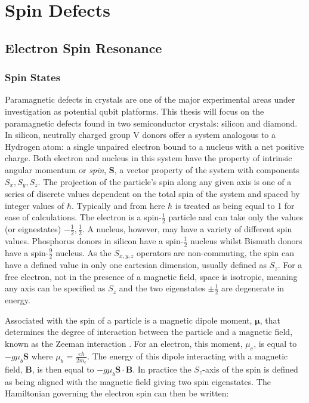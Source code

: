 
\chapter{Spin Defects}

\section{Electron Spin Resonance}
\subsection{Spin States}

Paramagnetic defects in crystals are one of the major experimental areas under investigation as potential qubit platforms. This thesis will focus on the paramagnetic defects found in two semiconductor crystals: silicon and diamond. In silicon, neutrally charged group V donors offer a system analogous to a Hydrogen atom: a single unpaired electron bound to a nucleus with a net positive charge. Both electron and nucleus in this system have the property of intrinsic angular momentum or \emph{spin}, $\mathbf{S}$, a vector property of the system with components $S_x, S_y, S_z$. The projection of the particle's spin along any given axis is one of a series of discrete values dependent on the total spin of the system and spaced by integer values of $\hbar$. Typically and from here $\hbar$ is treated as being equal to 1 for ease of calculations. The electron is a spin-$\frac{1}{2}$ particle and can take only the values (or eignestates) $-\frac{1}{2},\frac{1}{2}$. A nucleus, however, may have a variety of different spin values. Phosphorus donors in silicon have a spin-$\frac{1}{2}$ nucleus whilst Bismuth donors have a spin-$\frac{9}{2}$ nucleus. As the $S_{x,y,z}$ operators are non-commuting, the spin can have a defined value in only one cartesian dimension, usually defined as $S_z$. For a free electron, not in the presence of a magnetic field, space is isotropic, meaning any axis can be specified as $S_z$ and the two eigenstates $\pm\frac{1}{2}$ are degenerate in energy.

Associated with the spin of a particle is a magnetic dipole moment, $\mathbf{\mu}$, that determines the degree of interaction between the particle and a magnetic field, known as the Zeeman interaction \cite{10003989896}. For an electron, this moment, $\mu_e$, is equal to $-g\mu_b\mathbf{S}$ where $\mu_b$ = $\frac{e\hbar}{2m_e}$. The energy of this dipole interacting with a magnetic field, $\mathbf{B}$, is then equal to $-g\mu_b\mathbf{S}\cdot\mathbf{B}$. In practice the $S_z$-axis of the spin is defined as being aligned with the magnetic field giving two spin eigenstates. The Hamiltonian governing the electron spin can then be written:

